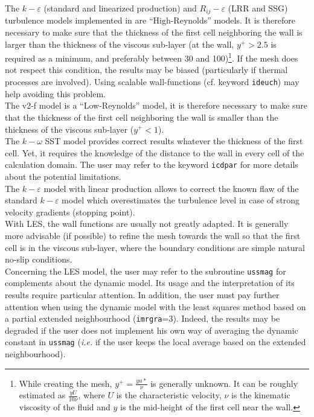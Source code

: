 The $k-\varepsilon$ (standard and linearized production) and $R_{ij}-\varepsilon$
(LRR and SSG) turbulence
models implemented in \CS are ``High-Reynolds'' models. It is therefore
necessary to make sure that the thickness of the first cell neighboring
the wall is larger than the thickness of the viscous sub-layer (at the
wall, $y^+>2.5$ is required as a minimum, and preferably between 30 and
100)\footnote{While creating the mesh, $y^+=\frac{yu*}{\nu}$ is
generally unknown. It can be roughly estimated as $\frac{yU}{10\nu}$, where
$U$ is the characteristic velocity, $\nu$ is the kinematic viscosity of the fluid
 and $y$ is the mid-height of the first cell near the wall.}. If the mesh does
 not respect this condition, the results may be biased
(particularly if thermal processes are involved). Using scalable wall-functions
(cf. keyword {\tt ideuch}) may help avoiding this problem.\\
The v2-f model is a ``Low-Reynolds'' model, it is therefore necessary to
make sure that the thickness of the first cell neighboring the wall is
smaller than the thickness of the viscous sub-layer ($y^+<1$).\\
The $k-\omega$ SST model provides correct results whatever the thickness of the first cell.
Yet, it requires the knowledge of the distance to the wall in every
cell of the calculation domain. The user may refer to the keyword
{\tt icdpar} for more details about the potential limitations.\\
The $k-\varepsilon$ model with linear production allows to correct the
known flaw of the standard $k-\varepsilon$ model which overestimates the
turbulence level in case of strong velocity gradients (stopping point).\\
With LES, the wall functions are usually not greatly adapted. It is generally more advisable
(if possible) to refine the mesh towards the wall so that the first cell is in the
viscous sub-layer, where the boundary conditions are simple natural no-slip conditions.\\
Concerning the LES model, the user may refer to the subroutine
\texttt{ussmag} for complements about the dynamic model. Its usage
and the interpretation of its results require particular attention.
In addition, the user must pay further attention when using the dynamic
model with the least squares method based on a partial extended
neighbourhood ({\tt imrgra}=3). Indeed, the results may be degraded if the user
does not implement his own way of averaging the dynamic constant in
\texttt{ussmag} (\textit{i.e.} if the user keeps the local average based
on the extended neighbourhood).\\


